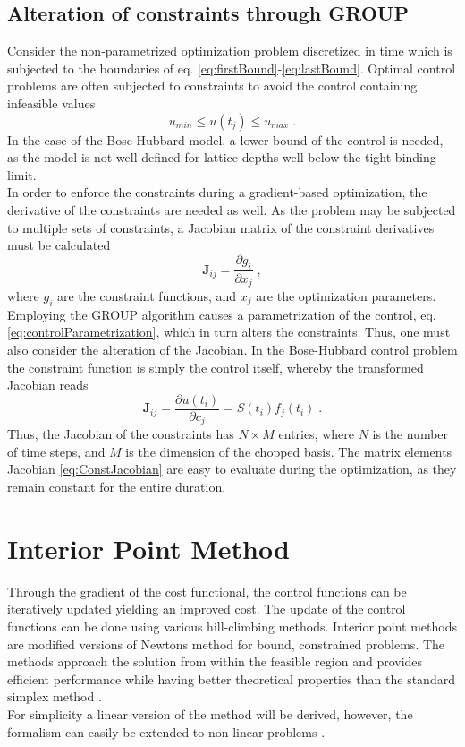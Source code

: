 \subsection{Alteration of constraints through GROUP}
Consider the non-parametrized optimization problem discretized in time which is subjected to the boundaries of eq. \eqref{eq:firstBound}-\eqref{eq:lastBound}. Optimal control problems are often subjected to constraints to avoid the control containing infeasible values
\begin{equation}
	 u_{min} \leq u(t_j) \leq u_{max} \; .
\end{equation}
In the case of the Bose-Hubbard model, a lower bound of the control is needed, as the model is not well defined for lattice depths well below the tight-binding limit.\\
In order to enforce the constraints during a gradient-based optimization, the derivative of the constraints are needed as well. As the problem may be subjected to multiple sets of constraints, a Jacobian matrix of the constraint derivatives must be calculated
\begin{equation}
	\boldsymbol{J}_{ij} = \frac{\partial g_i}{\partial x_j} \; ,
\end{equation}
where $g_i$ are the constraint functions, and $x_j$ are the optimization parameters.\\
Employing the GROUP algorithm causes a parametrization of the control, eq. \eqref{eq:controlParametrization}, which in turn alters the constraints. Thus, one must also consider the alteration of the Jacobian. In the Bose-Hubbard control problem the constraint function is simply the control itself, whereby the transformed Jacobian reads
\begin{equation}
	\boldsymbol{J}_{ij} = \frac{\partial u(t_i)}{\partial c_j} = S(t_i) f_j (t_i) \; . \label{eq:ConstJacobian}
\end{equation}
Thus, the Jacobian of the constraints has $N \times M$ entries, where $N$ is the number of time steps, and $M$ is the dimension of the chopped basis. The matrix elements Jacobian \ref{eq:ConstJacobian} are easy to evaluate during the optimization, as they remain constant for the entire duration.


\section{Interior Point Method} \label{sec:IntPoint}
Through the gradient of the cost functional, the control functions can be iteratively updated yielding an improved cost. The update of the control functions can be done using various hill-climbing methods.
Interior point methods are modified versions of Newtons method for bound, constrained problems. The methods approach the solution from within the feasible region and provides efficient performance while having better theoretical properties than the standard simplex method \cite{wright}.\\
For simplicity a linear version of the method will be derived, however, the formalism can easily be extended to non-linear problems \cite{wright}.

